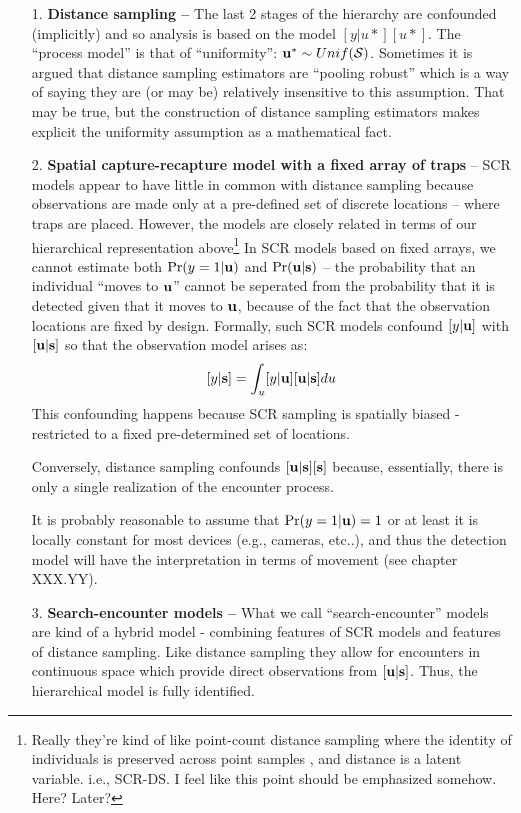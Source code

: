 \begin{itemize}
\item[1.] {\bf Distance sampling -- } The last 2 stages of the hierarchy
  are confounded (implicitly) and so analysis is based on the model
  $[y|u*] [u*]$. The ``process model'' is that of ``uniformity'': ${\bf u}^{*}
  \sim Unif({\cal S})$. Sometimes it is argued that distance sampling
  estimators are ``pooling robust'' which is a way of saying they are
  (or may be)
  relatively insensitive to this assumption. That may be true, but the
  construction of distance sampling estimators makes explicit the
  uniformity assumption as a mathematical fact.

\item[2.] {\bf Spatial capture-recapture model with a fixed array of traps} --
SCR models appear to have little in common with distance sampling
because observations are made only at a pre-defined set of discrete
locations -- where traps are placed. However, the models are closely
related in terms of our hierarchical representation above\footnote{Really
they're kind of like point-count distance sampling where the identity
of individuals is preserved across point samples , and distance is a
latent variable. i.e., SCR-DS. I feel like this point should be
emphasized somehow. Here? Later?}
In SCR models based on fixed arrays,
we cannot estimate both
$\Pr(y=1|{\bf u})$ and $\Pr({\bf u}|{\bf s})$ -- the probability  that
an individual ``moves to ${\bf u}$'' cannot be seperated from the
probability that it is detected given that it moves to ${\bf u}$,
because of the fact that the observation locations are fixed by
design.
Formally, such SCR models confound $[y|{\bf u}]$  with $[{\bf
  u}|{\bf s}]$ so that the observation model arises as:
\[
 [y|{\bf s}] = \int_{u} [y|{\bf u}][{\bf u}|{\bf s}] du
\]
This confounding happens because SCR sampling is spatially biased -
restricted to a fixed pre-determined set of locations.

Conversely,
distance sampling confounds $[{\bf u}|{\bf s}][{\bf s}]$ because, essentially, there is
only a single realization of the encounter process.

It is probably
reasonable to assume that $\Pr(y=1|{\bf u})=1$ or at least it is locally
constant for most devices (e.g., cameras, etc..), and thus the
detection model will have the interpretation in terms of movement (see
chapter XXX.YY).

\item[3.] {\bf Search-encounter models -- } What we call
  ``search-encounter'' models \citep{royle_etal:2011mee}
  are kind of a hybrid model - combining features of SCR models and
  features of distance sampling. Like distance sampling they allow for
  encounters in continuous space which provide direct observations
  from $[{\bf u}|{\bf s}]$.
Thus, the
  hierarchical model is fully identified.


\end{itemize}
